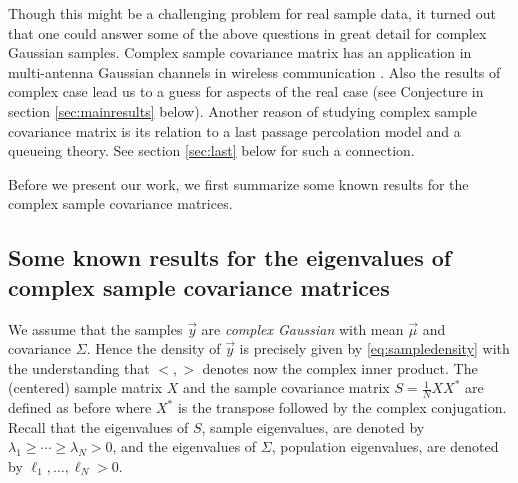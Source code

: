 \documentclass[11pt]{article}
\begin{document}
Though this might be a challenging problem for real sample data,
it turned out that one could answer some of the above questions in
great detail for complex Gaussian samples. Complex sample
covariance matrix has an application in multi-antenna Gaussian
channels in wireless communication \cite{Telatar}. Also the
results of complex case lead us to a guess for aspects of the real
case (see Conjecture in section \ref{sec:mainresults} below).
Another reason of studying complex sample covariance matrix is its
relation to a last passage percolation model and a queueing
theory. See section \ref{sec:last} below for such a connection.



Before we present our work, we first summarize some known results
for the complex sample covariance matrices.

\subsection{Some known results for the eigenvalues of complex sample
covariance matrices}

We assume that the samples $\vec{y}$ are \emph{complex Gaussian}
with mean $\vec{\mu}$ and covariance $\Sigma$. Hence the density
of $\vec{y}$ is precisely given by \eqref{eq:sampledensity} with
the understanding that $<,>$ denotes now the complex inner
product. The (centered) sample matrix $X$ and the sample
covariance matrix $S=\frac1{N}XX^*$ are defined as before where
$X^*$ is the transpose followed by the complex conjugation. Recall
that the eigenvalues of $S$, sample eigenvalues, are denoted by
$\lambda_1\ge \cdots \ge \lambda_N>0$, and the eigenvalues of
$\Sigma$, population eigenvalues, are denoted by $\ell_1, \dots,
\ell_N>0$.
\end{document}
